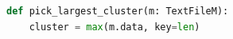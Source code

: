 \begin{lstlisting}[language=Python, caption={Picking the largest cluster}, label={lst:python-largest-cluster}]
def pick_largest_cluster(m: TextFileM):
    cluster = max(m.data, key=len)
\end{lstlisting}